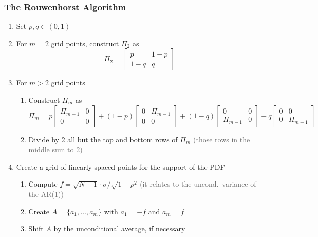 \documentclass[10pt, aspectratio=1610, handout]{beamer}
\newcommand{\dimmer}[1]{\textcolor{dimgray}{#1}}
\begin{document}
  \begin{frame}
    \frametitle{The Rouwenhorst Algorithm}

    \begin{enumerate}
      \item Set $p, q \in (0, 1)$
      \vfill\pause
      \item For $m=2$ grid points, construct $\Pi_2$ as
        \begin{equation*}
          \Pi_2 =
          \begin{bmatrix}
            p & 1 - p \\
            1 - q & q
          \end{bmatrix}
        \end{equation*}
      \vfill\pause
      \item For $m > 2$ grid points
        \begin{enumerate}
          \item Construct $\Pi_m$ as
            \begin{equation*}
              \Pi_m =
              p
              \begin{bmatrix}
                \Pi_{m-1} & 0 \\ 0 & 0
              \end{bmatrix}
              + (1 - p)
              \begin{bmatrix}
                0 & \Pi_{m-1} \\ 0 & 0
              \end{bmatrix}
              + (1 - q)
              \begin{bmatrix}
                0 & 0 \\ \Pi_{m-1} & 0
              \end{bmatrix}
              + q
              \begin{bmatrix}
                0 & 0 \\ 0 & \Pi_{m-1}
              \end{bmatrix}
            \end{equation*}
          \item Divide by 2 all but the top and bottom rows of $\Pi_m$ \hfill \dimmer{(those rows in the middle sum to 2)}
        \end{enumerate}
      \vfill\pause
      \item Create a grid of linearly spaced points for the support of the PDF
        \begin{enumerate}
          \item Compute $f = \sqrt{N - 1} \cdot \sigma / \sqrt{1 - \rho^2}$ \hfill \dimmer{(it relates to the uncond.~variance of the AR(1))}
          \item Create $A = \{ a_1, \ldots, a_m \}$ with $a_1 = -f$ and $a_m = f$
          \item Shift $A$ by the unconditional average, if necessary
        \end{enumerate}
    \end{enumerate}


\end{frame}
\end{document}
